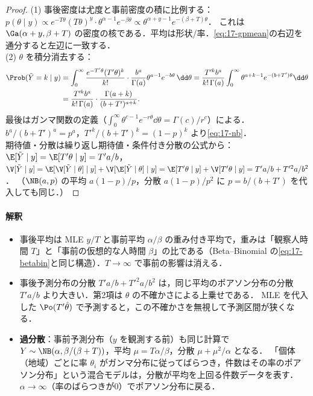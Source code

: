 \begin{proof}
(1) 事後密度は尤度と事前密度の積に比例する：
$p(\theta\mid y)\propto e^{-T\theta}(T\theta)^y\cdot\theta^{\alpha-1}e^{-\beta\theta}\propto\theta^{\alpha+y-1}e^{-(\beta+T)\theta}$．
これは $\Ga(\alpha+y,\beta+T)$ の密度の核である．平均は形状/率．\cref{eq:17-gpmean}の右辺を通分すると左辺に一致する．\\
(2) $\theta$ を積分消去する：
\begin{align*}
\Prob(\tilde Y=k\mid y)&=\int_0^\infty\frac{e^{-T'\theta}(T'\theta)^k}{k!}\cdot\frac{b^a}{\Gamma(a)}\theta^{a-1}e^{-b\theta}\,\dd\theta
=\frac{T'^kb^a}{k!\,\Gamma(a)}\int_0^\infty\theta^{a+k-1}e^{-(b+T')\theta}\dd\theta\\
&=\frac{T'^kb^a}{k!\,\Gamma(a)}\cdot\frac{\Gamma(a+k)}{(b+T')^{a+k}} .
\end{align*}
最後はガンマ関数の定義（$\int_0^\infty\theta^{c-1}e^{-r\theta}\dd\theta=\Gamma(c)/r^c$）による．$b^a/(b+T')^a=p^a$，$T'^k/(b+T')^k=(1-p)^k$ より\cref{eq:17-nb}．\\
期待値・分散は繰り返し期待値・条件付き分散の公式から：$\E[\tilde Y\mid y]=\E[T'\theta\mid y]=T'a/b$，
$\V[\tilde Y\mid y]=\E[\V[\tilde Y\mid\theta]\mid y]+\V[\E[\tilde Y\mid\theta]\mid y]=\E[T'\theta\mid y]+\V[T'\theta\mid y]=T'a/b+T'^2a/b^2$．
（$\NB(a,p)$ の平均 $a(1-p)/p$，分散 $a(1-p)/p^2$ に $p=b/(b+T')$ を代入しても同じ．）
\end{proof}
\paragraph{解釈}
\begin{itemize}
\item 事後平均は MLE $y/T$ と事前平均 $\alpha/\beta$ の重み付き平均で，重みは「観察人時間 $T$」と「事前の仮想的な人時間 $\beta$」の比である（Beta--Binomial の\cref{eq:17-betabin}と同じ構造）．$T\to\infty$ で事前の影響は消える．
\item 事後予測分布の分散 $T'a/b+T'^2a/b^2$ は，同じ平均のポアソン分布の分散 $T'a/b$ より大きい．第2項は $\theta$ の不確かさによる上乗せである．
      MLE を代入した $\Po(T'\hat\theta)$ で予測すると，この不確かさを無視して予測区間が狭くなる．
\item \textbf{過分散}：事前予測分布（$y$ を観測する前）も同じ計算で $Y\sim\NB(\alpha,\beta/(\beta+T))$，平均 $\mu=T\alpha/\beta$，分散 $\mu+\mu^2/\alpha$ となる．
      「個体（地域）ごとに率 $\theta_i$ がガンマ分布に従ってばらつき，件数はその率のポアソン分布」という混合モデルは，分散が平均を上回る件数データを表す．
      $\alpha\to\infty$（率のばらつきが0）でポアソン分布に戻る．
\end{itemize}
